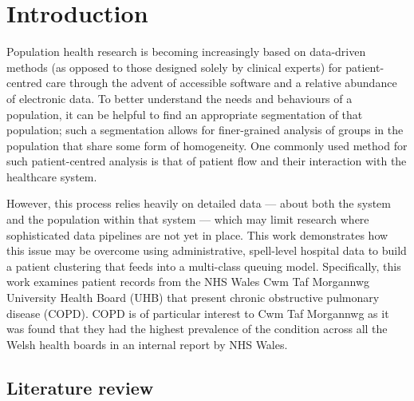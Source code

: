 \section{Introduction}\label{sec:intro}

Population health research is becoming increasingly based on data-driven methods
(as opposed to those designed solely by clinical experts) for patient-centred
care through the advent of accessible software and a relative abundance of
electronic data. To better understand the needs and behaviours of a population,
it can be helpful to find an appropriate segmentation of that population; such a
segmentation allows for finer-grained analysis of groups in the population that
share some form of homogeneity. One commonly used method for such
patient-centred analysis is that of patient flow and their interaction with the
healthcare system.

However, this process relies heavily on detailed data --- about both the system
and the population within that system --- which may limit research where
sophisticated data pipelines are not yet in place. This work demonstrates how
this issue may be overcome using administrative, spell-level hospital data to
build a patient clustering that feeds into a multi-class queuing model.
Specifically, this work examines patient records from the NHS Wales Cwm Taf
Morgannwg University Health Board (UHB) that present chronic obstructive
pulmonary disease (COPD). COPD is of particular interest to Cwm Taf Morgannwg as
it was found that they had the highest prevalence of the condition across all
the Welsh health boards in an internal report by NHS Wales.



\subsection{Literature review}\label{subsec:review}

